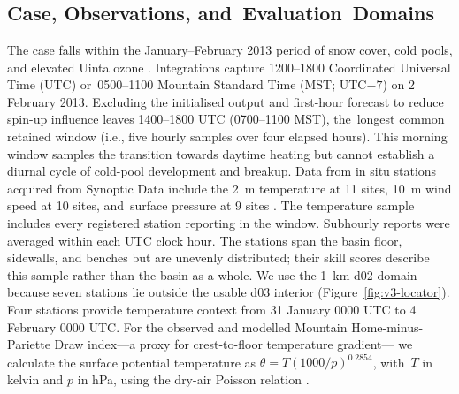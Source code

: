 \documentclass[air,article,accept,moreauthors]{Definitions/mdpi}
\begin{document}
\section{ %
}
\label{sec:v3-methods}


\subsection{Case, Observations, and~Evaluation~Domains}
\label{sec:v3-case}

The case falls within the January--February 2013 period of snow cover, cold pools, and elevated Uinta ozone \citep{Neemann2015-ws,Ahmadov2015Complete,Tran2018FDDA}.
Integrations capture 1200--1800 Coordinated Universal Time (UTC) or~0500--1100 Mountain Standard Time (MST; UTC$-7$) on 2 February 2013.
Excluding the initialised output and first-hour forecast to reduce spin-up influence leaves 1400--1800 UTC (0700--1100 MST), the~longest common retained window (i.e., five hourly samples over four elapsed hours).
This morning window samples the transition towards daytime heating but cannot establish a diurnal cycle of cold-pool development and breakup.
Data from in situ stations acquired from Synoptic Data include the 2~m temperature at 11 sites, 10~m wind speed at 10 sites, and~surface pressure at 9 sites \citep{SynopticTimeseries}.
The temperature sample includes every registered station reporting in the window.
Subhourly reports were averaged within each UTC clock hour.
The stations span the basin floor, sidewalls, and benches but are unevenly distributed; their skill scores describe this sample rather than the basin as a whole.
We use the 1~km d02 domain because seven stations lie outside the usable d03 interior (Figure~\ref{fig:v3-locator}).
Four stations provide temperature context from 31 January 0000 UTC to 4 February 0000 UTC.
For the observed and modelled Mountain Home-minus-Pariette Draw index---a proxy for crest-to-floor temperature gradient--- we calculate the surface potential temperature as $\theta=T(1000/p)^{0.2854}$, with~$T$ in kelvin and $p$ in hPa, using the dry-air Poisson relation \citep{WallaceHobbs2006}.
\end{document}
